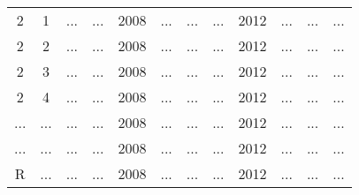 \documentclass[Journal]{ascelike}
\begin{document}
\begin{table}[htbp]
\begin{center}
\begin{tabular}{l|l|l|l|l|l|l|l|l|l|l|l}
\multicolumn{1}{c|}{2} & \multicolumn{1}{c|}{1} & \multicolumn{1}{c|}{ ... } & \multicolumn{1}{c|}{ ... } & \multicolumn{1}{c|}{2008} & \multicolumn{1}{c|}{ ... } & \multicolumn{1}{c|}{ ... } & \multicolumn{1}{c|}{ ... } & \multicolumn{1}{c|}{2012} & \multicolumn{1}{c|}{ ... } & \multicolumn{1}{c|}{ ... } & \multicolumn{1}{c}{ ... } \\ 
\multicolumn{1}{c|}{2} & \multicolumn{1}{c|}{2} & \multicolumn{1}{c|}{ ... } & \multicolumn{1}{c|}{ ... } & \multicolumn{1}{c|}{2008} & \multicolumn{1}{c|}{ ... } & \multicolumn{1}{c|}{ ... } & \multicolumn{1}{c|}{ ... } & \multicolumn{1}{c|}{2012} & \multicolumn{1}{c|}{ ... } & \multicolumn{1}{c|}{ ... } & \multicolumn{1}{c}{ ... } \\ 
\multicolumn{1}{c|}{2} & \multicolumn{1}{c|}{3} & \multicolumn{1}{c|}{ ... } & \multicolumn{1}{c|}{ ... } & \multicolumn{1}{c|}{2008} & \multicolumn{1}{c|}{ ... } & \multicolumn{1}{c|}{ ... } & \multicolumn{1}{c|}{ ... } & \multicolumn{1}{c|}{2012} & \multicolumn{1}{c|}{ ... } & \multicolumn{1}{c|}{ ... } & \multicolumn{1}{c}{ ... } \\ 
\multicolumn{1}{c|}{2} & \multicolumn{1}{c|}{4} & \multicolumn{1}{c|}{ ... } & \multicolumn{1}{c|}{ ... } & \multicolumn{1}{c|}{2008} & \multicolumn{1}{c|}{ ... } & \multicolumn{1}{c|}{ ... } & \multicolumn{1}{c|}{ ... } & \multicolumn{1}{c|}{2012} & \multicolumn{1}{c|}{ ... } & \multicolumn{1}{c|}{ ... } & \multicolumn{1}{c}{ ... } \\ 
\multicolumn{1}{c|}{...} & \multicolumn{1}{c|}{ ... } & \multicolumn{1}{c|}{ ... } & \multicolumn{1}{c|}{ ... } & \multicolumn{1}{c|}{2008} & \multicolumn{1}{c|}{ ... } & \multicolumn{1}{c|}{ ... } & \multicolumn{1}{c|}{ ... } & \multicolumn{1}{c|}{2012} & \multicolumn{1}{c|}{ ... } & \multicolumn{1}{c|}{ ... } & \multicolumn{1}{c}{ ... } \\ 
\multicolumn{1}{c|}{...} & \multicolumn{1}{c|}{ ... } & \multicolumn{1}{c|}{ ... } & \multicolumn{1}{c|}{ ... } & \multicolumn{1}{c|}{2008} & \multicolumn{1}{c|}{ ... } & \multicolumn{1}{c|}{ ... } & \multicolumn{1}{c|}{ ... } & \multicolumn{1}{c|}{2012} & \multicolumn{1}{c|}{ ... } & \multicolumn{1}{c|}{ ... } & \multicolumn{1}{c}{ ... } \\ 
\multicolumn{1}{c|}{R} & \multicolumn{1}{c|}{ ... } & \multicolumn{1}{c|}{ ... } & \multicolumn{1}{c|}{ ... } & \multicolumn{1}{c|}{2008} & \multicolumn{1}{c|}{ ... } & \multicolumn{1}{c|}{ ... } & \multicolumn{1}{c|}{ ... } & \multicolumn{1}{c|}{2012} & \multicolumn{1}{c|}{ ... } & \multicolumn{1}{c|}{ ... } & \multicolumn{1}{c}{ ... } \\ 
\hline
\end{tabular}
\label{table3}
\end{center}
\end{table}
\end{document}
